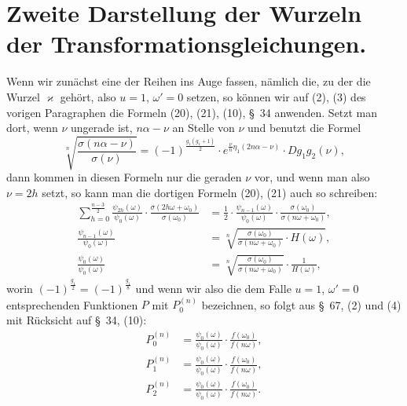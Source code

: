 \documentclass[12pt,a4paper]{article}
\theoremstyle{definition}
\begin{document}
\section{Zweite Darstellung der Wurzeln der Transformationsgleichungen.}\label{sec:68}

Wenn wir zunächst eine der Reihen ins Auge fassen, nämlich die, zu der die Wurzel $\varkappa$ gehört, also $u=1$, $\omega'=0$ setzen, so können wir auf (2), (3) des vorigen Paragraphen die Formeln (20), (21), (10), \S\ 34 anwenden. Setzt man dort, wenn $\nu$ ungerade ist, $n\alpha - \nu$ an Stelle von $\nu$ und benutzt die Formel
\[
\sqrt[n]{\frac{\sigma(n\alpha - \nu)}{\sigma(\nu)}} = (-1)^{\frac{g_1(g_1+1)}{2}} \cdot e^{\frac{\nu}{n}\eta_1(2n\alpha - \nu)} \cdot Dg_1g_2(\nu),
\]
dann kommen in diesen Formeln nur die geraden $\nu$ vor, und wenn man also $\nu = 2h$ setzt, so kann man die dortigen Formeln (20), (21) auch so schreiben:
\[
\begin{aligned}
\sum_{h=0}^{\frac{n-3}{2}} \frac{\psi_{2h}(\omega)}{\psi_0(\omega)} \cdot \frac{\sigma(2h\omega + \omega_0)}{\sigma(\omega_0)} &= \frac{1}{2} \cdot \frac{\psi_{n-1}(\omega)}{\psi_0(\omega)} \cdot \frac{\sigma(\omega_0)}{\sigma(n\omega + \omega_0)}, \\
\frac{\psi_{n-1}(\omega)}{\psi_0(\omega)} &= \sqrt[n]{\frac{\sigma(\omega_0)}{\sigma(n\omega + \omega_0)} \cdot H(\omega)}, \\
\frac{\psi_0(\omega)}{\psi_0(\omega)} &= \sqrt[n]{\frac{\sigma(\omega_0)}{\sigma(n\omega + \omega_0)}} \cdot \frac{1}{H(\omega)},
\end{aligned}
\]
worin $(-1)^{\frac{g_1}{2}} = (-1)^{\frac{g_1}{8}}$ und wenn wir also die dem Falle $u=1$, $\omega'=0$ entsprechenden Funktionen $P$ mit $P^{(n)}_0$ bezeichnen, so folgt aus \S\ 67, (2) und (4) mit Rücksicht auf \S\ 34, (10):
\begin{equation}\label{eq:68-1}
\begin{aligned}
P^{(n)}_0 &= \frac{\psi_0(\omega)}{\psi_0(\omega)} \cdot \frac{f(\omega_0)}{f(n\omega)}, \\
P^{(n)}_1 &= \frac{\psi_0(\omega)}{\psi_0(\omega)} \cdot \frac{f(\omega_0)}{f(n\omega)}, \\
P^{(n)}_2 &= \frac{\psi_0(\omega)}{\psi_0(\omega)} \cdot \frac{f(\omega_0)}{f(n\omega)}.
\end{aligned}
\end{equation}
\end{document}
